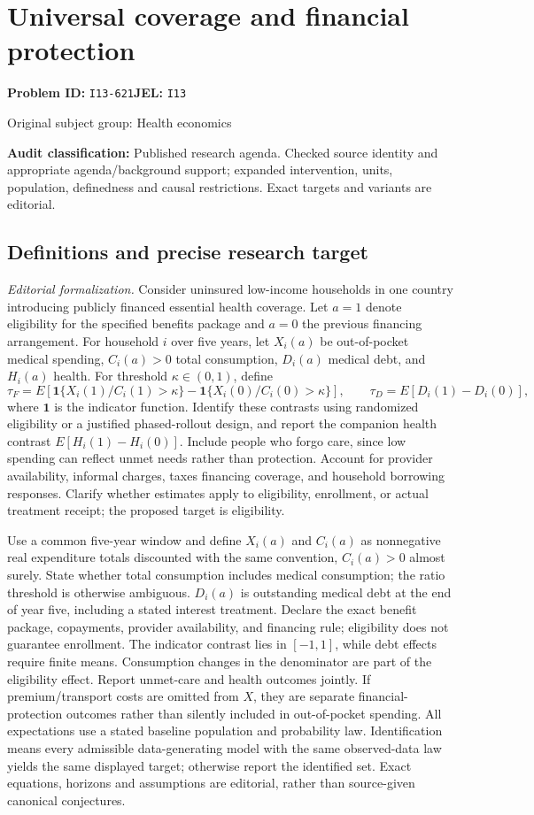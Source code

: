 \documentclass[11pt,a4paper]{article}
\begin{document}
\section*{Universal coverage and financial protection}
\textbf{Problem ID:} \texttt{I13-621}\quad \textbf{JEL:} \texttt{I13}\par
\label{problem:OP-0449}
{\sffamily\small\color{muted}Original subject group: Health economics\par}
\label{definitions:problem:30007731}
\textbf{Audit classification:} Published research agenda. Checked source identity and appropriate agenda/background support; expanded intervention, units, population, definedness and causal restrictions. Exact targets and variants are editorial.
\subsection*{Definitions and precise research target}
\textit{Editorial formalization.} Consider uninsured low-income households in one country introducing publicly financed essential health coverage. Let \(a=1\) denote eligibility for the specified benefits package and \(a=0\) the previous financing arrangement. For household \(i\) over five years, let \(X_i(a)\) be out-of-pocket medical spending, \(C_i(a)>0\) total consumption, \(D_i(a)\) medical debt, and \(H_i(a)\) health. For threshold \(\kappa\in(0,1)\), define
\[\tau_F=E[\mathbf1\{X_i(1)/C_i(1)>\kappa\}-\mathbf1\{X_i(0)/C_i(0)>\kappa\}],\qquad\tau_D=E[D_i(1)-D_i(0)],\]
where \(\mathbf1\) is the indicator function. Identify these contrasts using randomized eligibility or a justified phased-rollout design, and report the companion health contrast \(E[H_i(1)-H_i(0)]\). Include people who forgo care, since low spending can reflect unmet needs rather than protection. Account for provider availability, informal charges, taxes financing coverage, and household borrowing responses. Clarify whether estimates apply to eligibility, enrollment, or actual treatment receipt; the proposed target is eligibility.

Use a common five-year window and define \(X_i(a)\) and \(C_i(a)\) as nonnegative real expenditure totals discounted with the same convention, \(C_i(a)>0\) almost surely. State whether total consumption includes medical consumption; the ratio threshold is otherwise ambiguous. \(D_i(a)\) is outstanding medical debt at the end of year five, including a stated interest treatment. Declare the exact benefit package, copayments, provider availability, and financing rule; eligibility does not guarantee enrollment. The indicator contrast lies in \([-1,1]\), while debt effects require finite means. Consumption changes in the denominator are part of the eligibility effect. Report unmet-care and health outcomes jointly. If premium/transport costs are omitted from \(X\), they are separate financial-protection outcomes rather than silently included in out-of-pocket spending. All expectations use a stated baseline population and probability law. Identification means every admissible data-generating model with the same observed-data law yields the same displayed target; otherwise report the identified set. Exact equations, horizons and assumptions are editorial, rather than source-given canonical conjectures.
\end{document}
